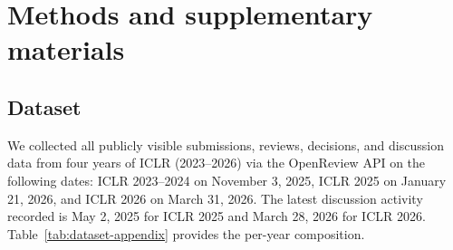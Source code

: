 \documentclass{article}
\begin{document}
\nocite{*}


\clearpage
\appendix

\section{Methods and supplementary materials}\label{app:methods}

\subsection{Dataset}\label{app:dataset}

We collected all publicly visible submissions, reviews, decisions, and discussion data from four years of ICLR (2023--2026) via the OpenReview API on the following dates: ICLR 2023--2024 on November 3, 2025, ICLR 2025 on January 21, 2026, and ICLR 2026 on March 31, 2026. The latest discussion activity recorded is May 2, 2025 for ICLR 2025 and March 28, 2026 for ICLR 2026. Table~\ref{tab:dataset-appendix} provides the per-year composition.
\end{document}
